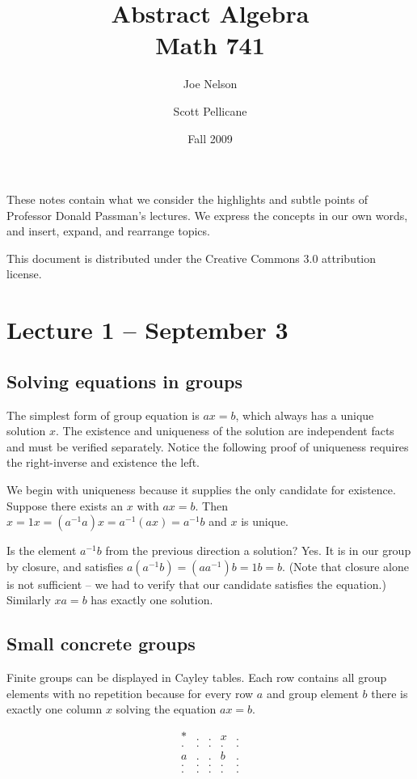\documentclass[letterpaper]{article}
\begin{document}
\title{Abstract Algebra\\
Math 741}
\author{Joe Nelson \and Scott Pellicane}
\date{Fall 2009}
\maketitle

These notes contain what we consider the highlights and subtle points of Professor Donald Passman's lectures. We express the concepts in our own words, and insert, expand, and rearrange topics.

This document is distributed under the Creative Commons 3.0 attribution license.

\section{Lecture 1 -- September 3}

\subsection{Solving equations in groups}

The simplest form of group equation is $ax = b$, which always has a unique solution $x$. The existence and uniqueness of the solution are independent facts and must be verified separately. Notice the following proof of uniqueness requires the right-inverse and existence the left.

We begin with uniqueness because it supplies the only candidate for existence.  Suppose there exists an $x$ with $ax = b$. Then $x = 1x = (a^{-1}a)x = a^{-1}(ax) = a^{-1}b$ and $x$ is unique.

Is the element $a^{-1}b$ from the previous direction a solution? Yes. It is in our group by closure, and satisfies $a(a^{-1}b) = (aa^{-1})b = 1b = b$.  (Note that closure alone is not sufficient -- we had to verify that our candidate satisfies the equation.) Similarly $xa = b$ has exactly one solution.

\subsection{Small concrete groups}

Finite groups can be displayed in Cayley tables. Each row contains all group elements with no repetition because for every row $a$ and group element $b$ there is exactly one column $x$ solving the equation $ax = b$.

\[
\begin{array}{r|*{5}{r}}
* & . & . & x & . \\
\hline
. & . & . & . & . \\
a & . & . & b & . \\
. & . & . & . & . \\
. & . & . & . & . \\
\end{array}
\]
\end{document}
